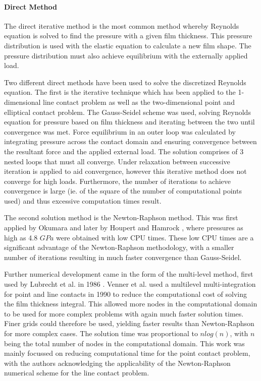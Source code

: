 \paragraph{Direct Method}

The direct iterative method is the most common method whereby Reynolds equation is solved to find the pressure with a given film thickness. This pressure distribution is used with the elastic equation to calculate a new film shape. The pressure distribution must also achieve equilibrium with the externally applied load.

Two different direct methods have been used to solve the discretized Reynolds equation. The first is the iterative technique which has been applied to the 1-dimensional line contact problem \cite{Hamrock1984} as well as the two-dimensional point \cite{Hamrock1976a} and elliptical \cite{Chittenden1985} contact problem. The Gauss-Seidel scheme was used, solving Reynolds equation for pressure based on film thickness and iterating between the two until convergence was met. Force equilibrium in an outer loop was calculated by integrating pressure across the contact domain and ensuring convergence between the resultant force and the applied external load. The solution comprises of 3 nested loops that must all converge. Under relaxation between successive iteration is applied to aid convergence, however this iterative method does not converge for high loads. Furthermore, the number of iterations to achieve convergence is large (ie. of the square of the number of computational points used) and thus excessive computation times result.

The second solution method is the Newton-Raphson method. This was first applied by Okumara \cite{Okumara1982} and later by Houpert and Hamrock \cite{Houpert1985}, where pressures as high as 4.8 $GPa$ were obtained with low CPU times. These low CPU times are a significant advantage of the Newton-Raphson methodology, with a smaller number of iterations resulting in much faster convergence than Gauss-Seidel.

Further numerical development came in the form of the multi-level method, first used by Lubrecht et al. in 1986 \cite{Lubrecht1986}. Venner et al. \cite{Venner1990} used a multilevel multi-integration for point and line contacts in 1990 to reduce the computational cost of solving the film thickness integral. This allowed more nodes in the computational domain to be used for more complex problems with again much faster solution times. Finer grids could therefore be used, yielding faster results than Newton-Raphson for more complex cases. The solution time was proportional to $n log(n)$, with $n $being the total number of nodes in the computational domain. This work was mainly focussed on reducing computational time for the point contact problem, with the authors acknowledging the applicability of the Newton-Raphson numerical scheme for the line contact problem.

